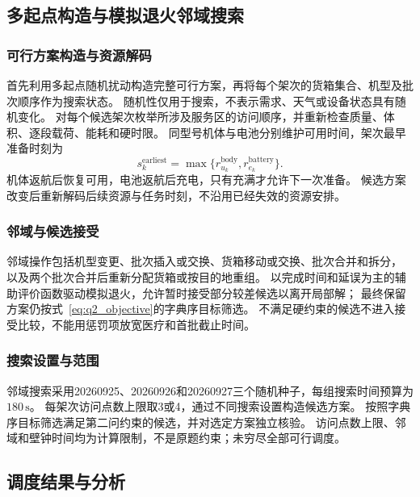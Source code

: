 \subsection{多起点构造与模拟退火邻域搜索}
\subsubsection{可行方案构造与资源解码}
首先利用多起点随机扰动构造完整可行方案，再将每个架次的货箱集合、机型及批次顺序作为搜索状态。
随机性仅用于搜索，不表示需求、天气或设备状态具有随机变化。
对每个候选架次枚举所涉及服务区的访问顺序，并重新检查质量、体积、逐段载荷、能耗和硬时限。
同型号机体与电池分别维护可用时间，架次最早准备时刻为
\begin{equation}
s_k^{\mathrm{earliest}}=\max\{r_{u_k}^{\mathrm{body}},r_{e_k}^{\mathrm{battery}}\}.
\end{equation}
机体返航后恢复可用，电池返航后充电，只有充满才允许下一次准备。
候选方案改变后重新解码后续资源与任务时刻，不沿用已经失效的资源安排。

\subsubsection{邻域与候选接受}
邻域操作包括机型变更、批次插入或交换、货箱移动或交换、批次合并和拆分，
以及两个批次合并后重新分配货箱或按目的地重组。
以完成时间和延误为主的辅助评价函数驱动模拟退火，允许暂时接受部分较差候选以离开局部解；
最终保留方案仍按式~\eqref{eq:q2_objective}的字典序目标筛选。
不满足硬约束的候选不进入接受比较，不能用惩罚项放宽医疗和首批截止时间。

\subsubsection{搜索设置与范围}
邻域搜索采用20260925、20260926和20260927三个随机种子，每组搜索时间预算为$180\,\mathrm{s}$。
每架次访问点数上限取3或4，通过不同搜索设置构造候选方案。
按照字典序目标筛选满足第二问约束的候选，并对选定方案独立核验。
访问点数上限、邻域和壁钟时间均为计算限制，不是原题约束；未穷尽全部可行调度。

\subsection{调度结果与分析}
